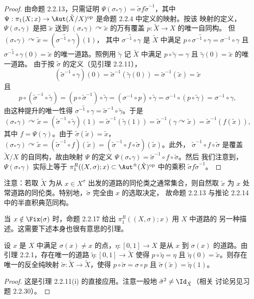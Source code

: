 \begin{proof}
由命题 2.2.13，只需证明 $\Psi(\sigma_*\gamma)=\tilde\sigma f\tilde\sigma^{-1}$，其中
$\Psi:\pi_1(X;x)\to\Aut(\tilde X/X)^{\mathrm{op}}$ 是命题 2.2.4 中定义的映射。按该
映射的定义，$\Psi(\sigma_*\gamma)$ 是把 $\tilde x$ 送到
$(\sigma_*\gamma)\curvearrowright\tilde x$ 的万有覆盖 $p:\tilde X\to X$ 的唯一自同构。
但 $(\sigma_*\gamma)\curvearrowright\tilde x=(\widetilde{\sigma^{-1}\circ\gamma})(1)$，
其中 $\widetilde{\sigma^{-1}\circ\gamma}$ 是 $\tilde X$ 中满足
$p\circ\widetilde{\sigma^{-1}\circ\gamma}=\sigma^{-1}\circ\gamma$ 且
$\widetilde{\sigma^{-1}\circ\gamma}(0)=\tilde x$ 的唯一道路。照例用 $\tilde\gamma$ 记
$\tilde X$ 中满足 $p\circ\tilde\gamma=\gamma$ 且 $\tilde\gamma(0)=\tilde x$ 的唯一道路。
由于按 $\tilde\sigma$ 的定义（见引理 2.2.11），
\[
(\tilde\sigma^{-1}\circ\gamma)(0)=\tilde\sigma^{-1}(\tilde\gamma(0))
=\tilde\sigma^{-1}(\tilde x)=\tilde x
\]
且
\[
p\circ(\tilde\sigma^{-1}\circ\tilde\gamma)
=(p\circ\tilde\sigma^{-1})\circ\tilde\gamma
=(\sigma^{-1}\circ p)\circ\tilde\gamma
=\sigma^{-1}\circ(p\circ\tilde\gamma)
=\sigma^{-1}\circ\gamma,
\]
由这种提升的唯一性得 $\widetilde{\sigma^{-1}\circ\gamma}
=\tilde\sigma^{-1}\circ\tilde\gamma$。于是
\[
(\sigma_*\gamma)\curvearrowright\tilde x
=(\tilde\sigma^{-1}\circ\tilde\gamma)(1)
=\tilde\sigma^{-1}(\tilde\gamma(1))
=\tilde\sigma^{-1}(\gamma\curvearrowright\tilde x)
=\tilde\sigma^{-1}(f(\tilde x)),
\]
其中 $f=\Psi(\gamma)$。由于 $\tilde\sigma(\tilde x)=\tilde x$，
$(\sigma_*\gamma)\curvearrowright\tilde x
=(\tilde\sigma^{-1}\circ f)(\tilde x)
=(\tilde\sigma^{-1}\circ f\circ\tilde\sigma)(\tilde x)$。此外，
$\tilde\sigma^{-1}\circ f\circ\tilde\sigma$ 是覆盖 $\tilde X/X$ 的自同构，故由映射
$\Psi$ 的定义 $\Psi(\sigma_*\gamma)=\tilde\sigma^{-1}\circ f\circ\tilde\sigma$。然后
我们注意到，$\Psi(\sigma_*\gamma)$ 实际上等于
$\pi^R_1((X,\sigma);x)\subset\Aut^{\pm}(\tilde X)^{\mathrm{op}}$ 中的乘积
$\tilde\sigma f\tilde\sigma^{-1}$。
\end{proof}

\begin{remark}\label{rem:2.2.15}
注意：若取 $\tilde X$ 为从 $x\in X^\sigma$ 出发的道路的同伦类之通常集合，则自然取
$\tilde x$ 为 $x$ 处常道路的同伦类。特别地，$\tilde\sigma$ 完全由 $x$ 的选取决定，
故命题 2.2.13 与推论 2.2.14 中的半直积典范同构。
\end{remark}

当 $x\notin\Fix(\sigma)$ 时，命题 2.2.17 给出 $\pi^R_1((X,\sigma);x)$ 用 $X$ 中道路的
另一种描述。这需要下述本身也很有意思的引理。

\begin{lemma}\label{lem:2.2.16}
设 $x$ 是 $X$ 中满足 $\sigma(x)\ne x$ 的点，$\eta:[0,1]\to X$ 是从 $x$ 到
$\sigma(x)$ 的道路。由引理 2.2.1，存在唯一的道路 $\tilde\eta:[0,1]\to\tilde X$
使得 $p\circ\tilde\eta=\eta$ 且 $\tilde\eta(0)=\tilde x$。则存在唯一的反全纯映射
$\tilde\sigma:\tilde X\to\tilde X$，使得 $p\circ\tilde\sigma=\sigma\circ p$ 且
$\tilde\sigma(\tilde x)=\tilde\eta(1)$。
\end{lemma}

\begin{proof}
这是引理 2.2.11(i) 的直接应用。注意一般地 $\tilde\sigma^2\ne\Id_{\tilde X}$（相关
讨论另见习题 2.2.30）。
\end{proof}

